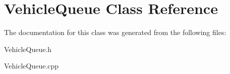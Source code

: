 \hypertarget{class_vehicle_queue}{\section{Vehicle\-Queue Class Reference}
\label{class_vehicle_queue}
}


The documentation for this class was generated from the following files\-:\begin{DoxyCompactItemize}
\item 
Vehicle\-Queue.\-h\item 
Vehicle\-Queue.\-cpp\end{DoxyCompactItemize}
